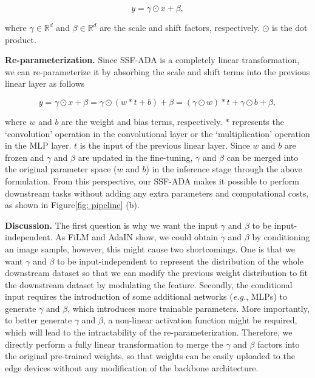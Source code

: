 \begin{equation}\label{eq: SSF-ADA}
	y = \gamma \odot x + \beta,
\end{equation}

where $\gamma \in \mathbb{R}^d$ and $\beta \in \mathbb{R}^d$ are the scale and shift factors, respectively. $\odot$ is the dot product. 

{\bf Re-parameterization.} Since SSF-ADA is a completely linear transformation, we can re-parameterize it by absorbing the scale and shift terms into the previous linear layer as follows

\begin{equation}\label{eq: re-parameterization}
	y = \gamma \odot x + \beta = \gamma \odot (w * t + b) + \beta = (\gamma \odot w) * t + \gamma \odot b + \beta,
\end{equation}

where $w$ and $b$ are the weight and bias terms, respectively. $*$ represents the `convolution' operation in the convolutional layer or the `multiplication' operation in the MLP layer. $t$ is the input of the previous linear layer. Since $w$ and $b$ are frozen and $\gamma$ and $\beta$ are updated in the fine-tuning, $\gamma$ and $\beta$ can be merged into the original parameter space ($w$ and $b$) in the inference stage through the above formulation. From this perspective, our SSF-ADA makes it possible to perform downstream tasks without adding any extra parameters and computational costs, as shown in Figure\ref{fig: pipeline} (b). 

{\bf Discussion.} The first question is why we want the input $\gamma$ and $\beta$ to be input-independent. As FiLM \cite{perez2018film} and AdaIN \cite{huang2017arbitrary} show, we could obtain $\gamma$ and $\beta$ by conditioning an image sample, however, this might cause two shortcomings. One is that we want $\gamma$ and $\beta$ to be input-independent to represent the distribution of the whole downstream dataset so that we can modify the previous weight distribution to fit the downstream dataset by modulating the feature. Secondly, the conditional input requires the introduction of some additional networks (\emph{e.g.}, MLPs) to generate $\gamma$ and $\beta$, which introduces more trainable parameters. More importantly, to better generate $\gamma$ and $\beta$, a non-linear activation function might be required, which will lead to the intractability of the re-parameterization. Therefore, we directly perform a fully linear transformation to merge the $\gamma$ and $\beta$ factors into the original pre-trained weights, so that weights can be easily uploaded to the edge devices without any modification of the backbone architecture. 

